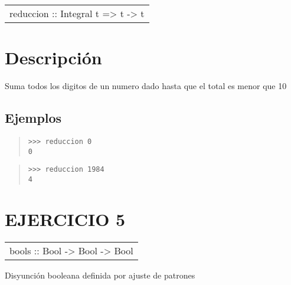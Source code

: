 \begin{haddockdesc}
\item[\begin{tabular}{@{}l}
reduccion :: Integral t => t -> t
\end{tabular}]
{\haddockbegindoc
\section*{Descripción}
Suma todos los digitos de un numero dado hasta que el total es menor que 10\par
\subsection*{Ejemplos}
\begin{quote}
{\haddockverb\begin{verbatim}
>>> reduccion 0
0

\end{verbatim}}
\end{quote}
\begin{quote}
{\haddockverb\begin{verbatim}
>>> reduccion 1984
4

\end{verbatim}}
\end{quote}}
\end{haddockdesc}
\section{EJERCICIO 5}
\begin{haddockdesc}
\item[\begin{tabular}{@{}l}
bools :: Bool -> Bool -> Bool
\end{tabular}]
{\haddockbegindoc
Disyunción booleana definida por ajuste de patrones\par}
\end{haddockdesc}